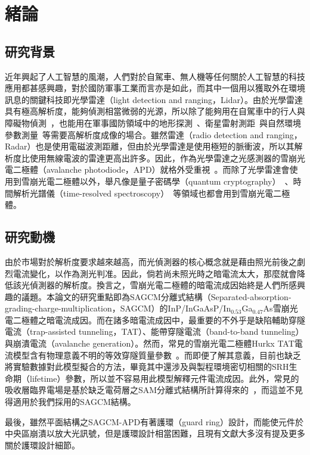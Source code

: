 \chapter{緒論}
\label{c:intro}
\section{研究背景}
近年興起了人工智慧的風潮，人們對於自駕車、無人機等任何關於人工智慧的科技應用都甚感興趣，對於國防軍事工業而言亦是如此，而其中一個用以獲取外在環境訊息的關鍵科技即光學雷達（light detection and ranging，Lidar）。由於光學雷達具有極高解析度，能夠偵測相當微弱的光源，所以除了能夠用在自駕車中的行人與障礙物偵測~\cite{hecht2018lidar}，也能用在軍事國防領域中的地形探測~\cite{dabney2010slope}\cite{degnan2002photon}、衛星雷射測距~\cite{degnan1985satellite}\cite{sun2013simultaneous}與自然環境參數測量~\cite{zwally2002icesat}等需要高解析度成像的場合。雖然雷達（radio detection and ranging，Radar）也是使用電磁波測距離，但由於光學雷達是使用極短的脈衝波，所以其解析度比使用無線電波的雷達更高出許多。因此，作為光學雷達之光感測器的雪崩光電二極體（avalanche photodiode，APD）就格外受重視~\cite{weitkamp2006lidar}。而除了光學雷達會使用到雪崩光電二極體以外，舉凡像是量子密碼學（quantum cryptography）~\cite{gisin2002quantum}、時間解析光譜儀（time-resolved spectroscopy）~\cite{bargigia2011time}等領域也都會用到雪崩光電二極體。
\section{研究動機}
由於市場對於解析度要求越來越高，而光偵測器的核心概念就是藉由照光前後之劇烈電流變化，以作為測光判准。因此，倘若尚未照光時之暗電流太大，那麼就會降低該光偵測器的解析度。換言之，雪崩光電二極體的暗電流成因始終是人們所感興趣的議題。本論文的研究重點即為SAGCM分離式結構（Separated-absorption-grading-charge-multiplication，SAGCM）的InP/InGaAsP/In$_{0.53}$Ga$_{0.47}$As雪崩光電二極體之暗電流成因。而在諸多暗電流成因中，最重要的不外乎是缺陷輔助穿隧電流（trap-assisted tunneling，TAT）、能帶穿隧電流（band-to-band tunneling）與崩潰電流（avalanche generation）。然而，常見的雪崩光電二極體Hurkx TAT電流模型含有物理意義不明的等效穿隧質量參數~\cite{hurkx1989modelling}。而即便了解其意義，目前也缺乏將實驗數據對此模型擬合的方法，畢竟其中還涉及與製程環境密切相關的SRH生命期（lifetime）參數，所以並不容易用此模型解釋元件電流成因。此外，常見的吸收層臨界電場是基於缺乏電荷層之SAM分離式結構所計算得來的~\cite{Ando:1980fn}，而這並不見得適用於我們採用的SAGCM結構。

最後，雖然平面結構之SAGCM-APD有著護環（guard ring）設計，而能使元件於中央區崩潰以放大光訊號，但是護環設計相當困難，且現有文獻大多沒有提及更多關於護環設計細節。
